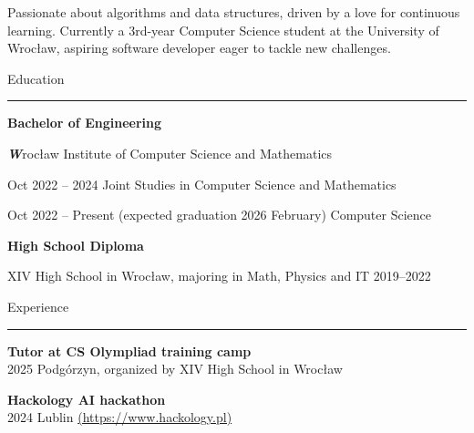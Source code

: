 \documentclass{letter}
\begin{document}
\hfill
\begin{minipage}[t]{0.70\textwidth}
\setlength{\baselineskip}{1.5\baselineskip}

\begin{tcolorbox}[colback=white, colframe=white, width=\textwidth, boxrule=0pt, sharp corners, height=\textheight, left=5mm, right=5mm, top=5mm, bottom=5mm]

\color{black}

\vspace{0.5cm}
{\fontsize{30pt}{1pt} \textbf \FullName}

\vspace{0.3cm}

\begin{spacing}{1.125}
\small 
Passionate about algorithms and data structures, driven by a love for continuous learning. Currently a 3rd-year Computer Science student at the University of Wrocław, aspiring software developer eager to tackle new challenges.

\end{spacing}

\vspace{\SectionSpacing}

{\large Education}
\rule{\linewidth}{0.4pt}

{\large \textbf{Bachelor of Engineering}} 

{ 
{\textit \textbf Wrocław Institute of Computer Science and Mathematics}

{\small Oct 2022 -- 2024}
{Joint Studies in Computer Science and Mathematics }

{\small Oct 2022 -- Present (expected graduation 2026 February)}
{Computer Science}

}

{\large \textbf{High School Diploma}}

{ 
{\small XIV High School in Wrocław, majoring in Math, Physics and IT  2019--2022}

}

\vspace{\SectionSpacing}

{\large Experience}
\rule{\linewidth}{0.4pt}

{ 

\vspace{1mm}
\textbf{Tutor at CS Olympliad training camp} \\
{\small 2025 Podgórzyn, organized by XIV High School in Wrocław}

\vspace{1mm}
\textbf{Hackology AI hackathon} \\
{\small 2024 Lublin \href{https://www.hackology.pl/}{(https://www.hackology.pl)}}

}
\end{tcolorbox}
\end{minipage}
\end{document}
